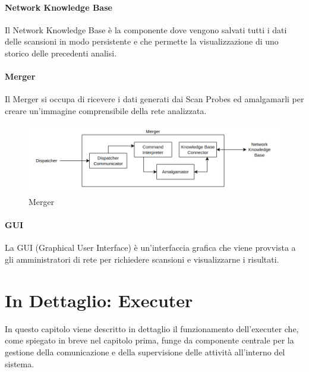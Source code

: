 \documentclass[target=bach,aauheader=,style=]{thud}
\begin{document}
\FloatBarrier


\subsubsection{Network Knowledge Base} 
Il Network Knowledge Base è la componente dove vengono salvati tutti i dati delle scansioni in modo persistente e che permette la visualizzazione di uno storico delle precedenti analisi.

\FloatBarrier

\subsubsection{Merger}
Il Merger si occupa di ricevere i dati generati dai Scan Probes ed amalgamarli per creare un'immagine comprensibile della rete analizzata. 


\begin{figure}[h]
  \includegraphics[width=\columnwidth]{merger}
  \centering
  \caption{Merger}
  \label{merger}
\end{figure}

\FloatBarrier


\subsubsection{GUI} 
La GUI (Graphical User Interface) è un'interfaccia grafica che viene provvista a gli amministratori di rete per richiedere scansioni e visualizzarne i risultati.

\FloatBarrier

\chapter{In Dettaglio: Executer}
In questo capitolo viene descritto in dettaglio il funzionamento dell'executer che, come spiegato in breve nel capitolo prima, funge da componente centrale per la gestione della comunicazione e della supervisione delle attività all'interno del sistema.
\end{document}
